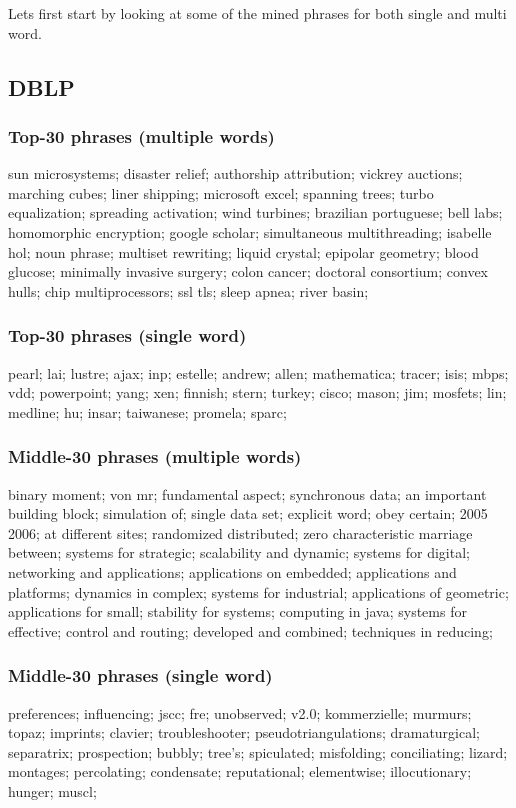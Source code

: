 \documentclass[11pt]{article}
\begin{document}
Lets first start by looking at some of the mined phrases for both single and multi word.

\subsection*{DBLP}
\subsubsection*{Top-30 phrases (multiple words)}
sun microsystems;
disaster relief;
authorship attribution;
vickrey auctions;
marching cubes;
liner shipping;
microsoft excel;
spanning trees;
turbo equalization;
spreading activation;
wind turbines;
brazilian portuguese;
bell labs;
homomorphic encryption;
google scholar;
simultaneous multithreading;
isabelle hol;
noun phrase;
multiset rewriting;
liquid crystal;
epipolar geometry;
blood glucose;
minimally invasive surgery;
colon cancer;
doctoral consortium;
convex hulls;
chip multiprocessors;
ssl tls;
sleep apnea;
river basin;

\subsubsection*{Top-30 phrases (single word)}
pearl;
lai;
lustre;
ajax;
inp;
estelle;
andrew;
allen;
mathematica;
tracer;
isis;
mbps;
vdd;
powerpoint;
yang;
xen;
finnish;
stern;
turkey;
cisco;
mason;
jim;
mosfets;
lin;
medline;
hu;
insar;
taiwanese;
promela;
sparc;

\subsubsection*{Middle-30 phrases (multiple words)}
binary moment;
von mr;
fundamental aspect;
synchronous data;
an important building block;
simulation of;
single data set;
explicit word;
obey certain;
2005 2006;
at different sites;
randomized distributed;
zero characteristic
marriage between;
systems for strategic;
scalability and dynamic;
systems for digital;
networking and applications;
applications on embedded;
applications and platforms;
dynamics in complex;
systems for industrial;
applications of geometric;
applications for small;
stability for systems;
computing in java;
systems for effective;
control and routing;
developed and combined;
techniques in reducing;

\subsubsection*{Middle-30 phrases (single word)}
preferences;
influencing;
jscc;
fre;
unobserved;
v2.0;
kommerzielle;
murmurs;
topaz;
imprints;
clavier;
troubleshooter;
pseudotriangulations;
dramaturgical;
separatrix;
prospection;
bubbly;
tree's;
spiculated;
misfolding;
conciliating;
lizard;
montages;
percolating;
condensate;
reputational;
elementwise;
illocutionary;
hunger;
muscl;
\end{document}
